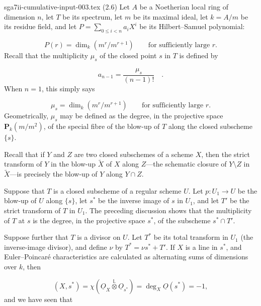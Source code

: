 \begin{filecontents*}{sga7ii-cumulative-input-003.tex}
(2.6) Let $A$ be a Noetherian local ring of dimension $n$, let $T$ be its
spectrum, let $m$ be its maximal ideal, let $k=A/m$ be its residue field, and let
$P=\sum_{0\leq i<n}a_iX^i$ be its Hilbert--Samuel polynomial:

\begin{equation*}
P(r)=\dim_k(m^r/m^{r+1})\qquad\text{for sufficiently large }r.
\end{equation*}
Recall that the multiplicity $\mu_s$ of the closed point $s$ in $T$ is defined by

\begin{equation*}
a_{n-1}=\frac{\mu_s}{(n-1)!} \quad .
\end{equation*}
When $n=1$, this simply says

\begin{equation*}
\mu_s=\dim_k(m^r/m^{r+1})\qquad\text{for sufficiently large }r.
\end{equation*}
Geometrically, $\mu_s$ may be defined as the degree, in the projective space
$\mathbf P_k(m/m^2)$, of the special fibre of the blow-up of $T$ along the closed
subscheme $\{s\}$.


Recall that if $Y$ and $Z$ are two closed subschemes of a scheme $X$, then the
strict transform of $Y$ in the blow-up $\widetilde X$ of $X$ along $Z$---the
schematic closure of $Y\setminus Z$ in $\widetilde X$---is precisely the blow-up
of $Y$ along $Y\cap Z$.

Suppose that $T$ is a closed subscheme of a regular scheme $U$.  Let
$p:U_1\longrightarrow U$ be the blow-up of $U$ along $\{s\}$, let $s^*$ be the
inverse image of $s$ in $U_1$, and let $T'$ be the strict transform of $T$ in
$U_1$.  The preceding discussion shows that the multiplicity of $T$ at $s$ is
the degree, in the projective space $s^*$, of the subscheme $s^*\cap T'$.

Suppose further that $T$ is a divisor on $U$.  Let $T^*$ be its total transform
in $U_1$ (the inverse-image divisor), and define $\nu$ by
$T^*=\nu s^*+T'$.  If $X$ is a line in $s^*$, and Euler--Poincaré
characteristics are calculated as alternating sums of dimensions over $k$, then

\begin{equation}\tag{2.6.1}
(X,s^*)=
\chi(\underline{O}_X\overset{\mathbb L}{\otimes}\underline{O}_{s^*})
=\deg_X\underline{O}(s^*)=-1,
\end{equation}
and we have seen that


\end{filecontents*}
